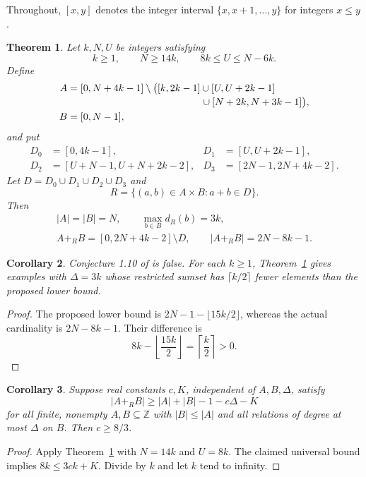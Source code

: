 \documentclass[11pt]{article}
\newtheorem{theorem}{Theorem}
\newtheorem{corollary}[theorem]{Corollary}
\newcommand{\Z}{\mathbb Z}
\newcommand{\res}{\mathbin{+_{R}}}
\begin{document}
Throughout, $[x,y]$ denotes the integer interval $\{x,x+1,\ldots,y\}$ for integers $x\leq y$.

\begin{theorem}\label{thm:construction}
Let $k,N,U$ be integers satisfying
\begin{equation}\label{eq:parameters}
 k\geq1,\qquad N\geq14k,\qquad 8k\leq U\leq N-6k.
\end{equation}
Define
\begin{align*}
 A={}&[0,N+4k-1]\setminus\bigl([k,2k-1]\cup[U,U+2k-1]\nobreak\\[-2pt]
 &\hspace{43mm}\cup[N+2k,N+3k-1]\bigr),\\
 B={}&[0,N-1],
\end{align*}
and put
\begin{align*}
 D_0&=[0,4k-1],& D_1&=[U,U+2k-1],\\
 D_2&=[U+N-1,U+N+2k-2],&
 D_3&=[2N-1,2N+4k-2].
\end{align*}
Let $D=D_0\cup D_1\cup D_2\cup D_3$ and
\[
 R=\{(a,b)\in A\times B:a+b\in D\}.
\]
Then
\begin{gather*}
 |A|=|B|=N,\qquad \max_{b\in B}d_R(b)=3k,\\
 A\res B=[0,2N+4k-2]\setminus D,\qquad
 |A\res B|=2N-8k-1.
\end{gather*}
\end{theorem}

\begin{corollary}\label{cor:failure}
Conjecture 1.10 of \cite{Ouyang} is false. For each $k\geq1$, Theorem~\ref{thm:construction} gives examples with $\Delta=3k$ whose restricted sumset has $\lceil k/2\rceil$ fewer elements than the proposed lower bound.
\end{corollary}
\begin{proof}
The proposed lower bound is $2N-1-\lfloor15k/2\rfloor$, whereas the actual cardinality is $2N-8k-1$. Their difference is
\[
 8k-\left\lfloor\frac{15k}{2}\right\rfloor
 =\left\lceil\frac{k}{2}\right\rceil>0.
\]
\end{proof}

\begin{corollary}\label{cor:coefficient}
Suppose real constants $c,K$, independent of $A,B,\Delta$, satisfy
\[
 |A\res B|\geq |A|+|B|-1-c\Delta-K
\]
for all finite, nonempty $A,B\subseteq\Z$ with $|B|\leq|A|$ and all relations of degree at most $\Delta$ on $B$. Then $c\geq8/3$.
\end{corollary}
\begin{proof}
Apply Theorem~\ref{thm:construction} with $N=14k$ and $U=8k$. The claimed universal bound implies $8k\leq3ck+K$. Divide by $k$ and let $k$ tend to infinity.
\end{proof}
\end{document}
